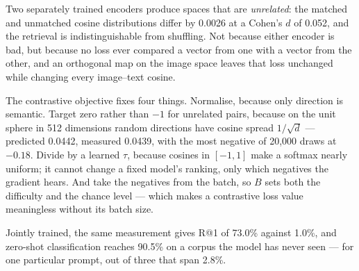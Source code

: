 \documentclass[11pt,a4paper]{article}
\begin{document}
Two separately trained encoders produce spaces that are \emph{unrelated}: the
matched and unmatched cosine distributions differ by 0.0026 at a Cohen's $d$ of
0.052, and the retrieval is indistinguishable from shuffling. Not because
either encoder is bad, but because no loss ever compared a vector from one with
a vector from the other, and an orthogonal map on the image space leaves that
loss unchanged while changing every image--text cosine.

The contrastive objective fixes four things. Normalise, because only direction
is semantic. Target zero rather than $-1$ for unrelated pairs, because on the unit
sphere in 512 dimensions random directions have cosine spread $1/\sqrt d$ --- predicted
0.0442, measured 0.0439, with the most negative of 20{,}000 draws at $-0.18$.
Divide by a learned $\tau$, because cosines in $[-1,1]$ make a softmax nearly
uniform; it cannot change a fixed model's ranking, only which negatives the
gradient hears. And take the negatives from the batch, so $B$ sets both the
difficulty and the chance level --- which makes a contrastive loss value
meaningless without its batch size.

Jointly trained, the same measurement gives R@1 of 73.0\% against 1.0\%, and
zero-shot classification reaches 90.5\% on a corpus the model has never seen
--- for one particular prompt, out of three that span 2.8\%.
\end{document}
